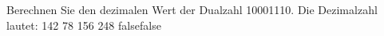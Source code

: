     {Berechnen Sie den dezimalen Wert der Dualzahl 10001110. Die Dezimalzahl lautet:}
    {142}
    {78}
    {156}
    {248}
    {false}{false}